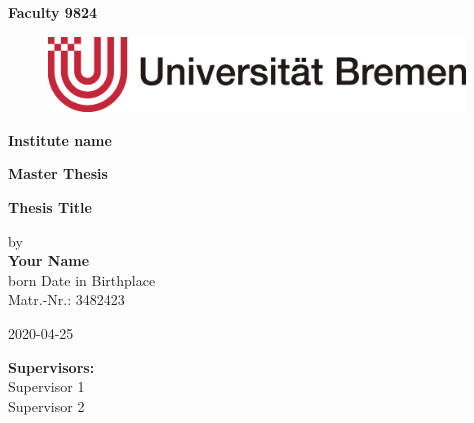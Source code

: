 \documentclass[oneside,12pt,a4paper,bibliography=totocnumbered,numbers=noenddot,table]{scrreprt} %
\begin{document}

\begin{titlepage}
\thispagestyle{empty}
\begin{center}

\textsf{\textbf{Faculty 9824}}\\

\begin{figure}[h!]
    \centering
    \includegraphics[height=2cm]{includes/UniBremen.pdf}
\end{figure}

\textsf{\textbf{Institute name}}\\[1,0cm]

\begin{Large}
    \textsf{\textbf{Master Thesis}}\\[0,75cm]
\end{Large}

\begin{LARGE}
    \textsf{\textbf{Thesis Title}}\\[1,5cm]
\end{LARGE}

\vspace{1.5em}

\begin{large}
    \textsf{by}\\[0,1cm]
    \textsf{\textbf{Your Name}}\\[0,1cm]
    \textsf{born Date in Birthplace}\\[0,1cm]
    \textsf{Matr.-Nr.: 3482423}\\[1,5cm]

    \vspace{0.5em}

    \textsf{2020-04-25}
\end{large}

\vspace{1.5em}

\begin{large}
    \textsf{\textbf{Supervisors:}}\\[0,3cm]
        \textsf{Supervisor 1}\\[0.5em]
        \textsf{Supervisor 2}\\[0.5em]
    \end{large}

\end{center}

\end{titlepage}
\thispagestyle{empty}
\cleardoublepage
\end{document}
